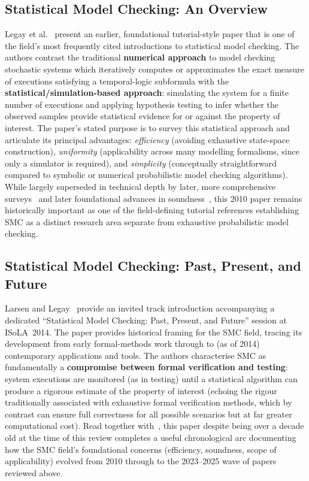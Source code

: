\subsection{Statistical Model Checking: An Overview}
\label{sec:lr_legay}

Legay et al.~\cite{legay2010smc} present an earlier, foundational
tutorial-style paper that is one of the field's most frequently cited
introductions to statistical model checking.  The authors contrast the
traditional \textbf{numerical approach} to model checking stochastic
systems which iteratively computes or approximates the exact measure of
executions satisfying a temporal-logic subformula with the
\textbf{statistical/simulation-based approach}: simulating the system for
a finite number of executions and applying hypothesis testing to infer
whether the observed samples provide statistical evidence for or against
the property of interest.  The paper's stated purpose is to survey this
statistical approach and articulate its principal advantages:
\emph{efficiency} (avoiding exhaustive state-space construction),
\emph{uniformity} (applicability across many modelling formalisms, since
only a simulator is required), and \emph{simplicity} (conceptually
straightforward compared to symbolic or numerical probabilistic model
checking algorithms).  While largely superseded in technical depth by
later, more comprehensive surveys~\cite{agha2018survey} and later
foundational advances in soundness~\cite{budde2025sound}, this 2010
paper remains historically important as one of the field-defining
tutorial references establishing SMC as a distinct research area separate
from exhaustive probabilistic model checking.

\subsection{Statistical Model Checking: Past, Present, and Future}
\label{sec:lr_larsen}

Larsen and Legay~\cite{larsen2014smc} provide an invited track
introduction accompanying a dedicated ``Statistical Model Checking:
Past, Present, and Future'' session at ISoLA~2014.  The paper provides
historical framing for the SMC field, tracing its development from early
formal-methods work through to (as of 2014) contemporary applications
and tools.  The authors characterise SMC as fundamentally a
\textbf{compromise between formal verification and testing}: system
executions are monitored (as in testing) until a statistical algorithm
can produce a rigorous estimate of the property of interest (echoing the
rigour traditionally associated with exhaustive formal verification
methods, which by contrast can ensure full correctness for all possible
scenarios but at far greater computational cost).  Read together
with~\cite{kanav2025smc2024, agha2018survey, legay2010smc}, this
paper despite being over a decade old at the time of this
review completes a useful chronological arc documenting how the SMC
field's foundational concerns (efficiency, soundness, scope of
applicability) evolved from 2010 through to the 2023--2025 wave of
papers reviewed above.


